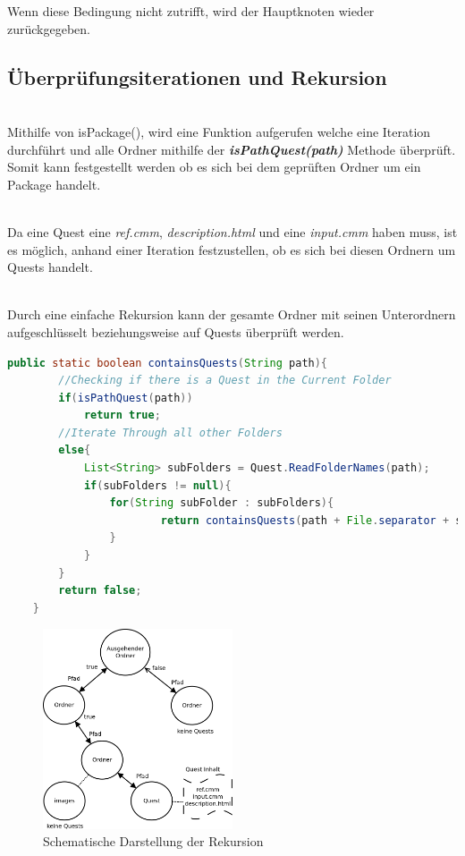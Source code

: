 Wenn diese Bedingung nicht zutrifft, wird der Hauptknoten wieder zurückgegeben.

\subsection{Überprüfungsiterationen und Rekursion}
\\
Mithilfe von isPackage(), wird eine Funktion aufgerufen welche eine Iteration durchführt und alle Ordner mithilfe der \textit{\textbf{isPathQuest(path)}} Methode überprüft. Somit kann festgestellt werden ob es sich bei dem geprüften Ordner um ein Package handelt.

\\
Da eine Quest eine \textit{ref.cmm}, \textit{description.html} und eine \textit{input.cmm} haben muss, ist es möglich, anhand einer Iteration festzustellen, ob es sich bei diesen Ordnern um Quests handelt.

\\
Durch eine einfache Rekursion kann der gesamte Ordner mit seinen Unterordnern aufgeschlüsselt beziehungsweise auf Quests überprüft werden.

\begin{lstlisting}[language=JAVA]
	public static boolean containsQuests(String path){
		//Checking if there is a Quest in the Current Folder
		if(isPathQuest(path))
			return true;
		//Iterate Through all other Folders
		else{
			List<String> subFolders = Quest.ReadFolderNames(path);
			if(subFolders != null){
				for(String subFolder : subFolders){
						return containsQuests(path + File.separator + subFolder);
				}
			}
		}
		return false;
	}
\end{lstlisting}



\begin{figure}[h] 
  \centering
     \includegraphics[width=0.5\textwidth]{./media/images/gui/quest-control-rekursion.png}
  \caption{Schematische Darstellung der Rekursion}
  \label{fig:JTree_Control_Rekursion}
\end{figure}

